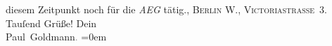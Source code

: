 \begin{ledgroupsized}[t]{13cm}
{{{                  diesem Zeitpunkt noch für die \emph{AEG}
                  tätig.}}}\label{K_L03218-1h}, \textsc{Berlin W.}, \textsc{Victoriastraſse 3}. Tauſend Grüße!\pend
           \pstart
           Dein {\\[\baselineskip]}\spacefill\mbox{Paul Goldmann\textcolor{gray}{.}}\pend
           \leftskip=0em{}
         
         \endnumbering{}\end{ledgroupsized}  \newcommand{\dateiname}{L03218}\newcommand{\titel}{Paul Goldmann an Arthur Schnitzler, 9. 8. 1902}\newcommand{\editorInnen}{Martin Anton Müller und Laura Untner}
      
